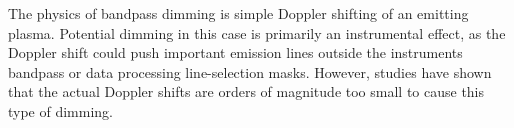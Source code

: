 The physics of bandpass dimming is simple Doppler shifting of an emitting plasma. Potential dimming in this case is primarily an instrumental effect, as the Doppler shift could push important emission lines outside the instruments bandpass or data processing line-selection masks. However, studies have shown that the actual Doppler shifts are orders of magnitude too small to cause this type of dimming. 

